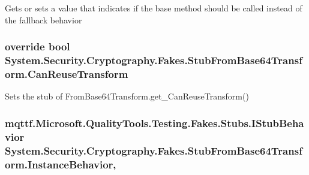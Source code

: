 Gets or sets a value that indicates if the base method should be called instead of the fallback behavior

\hypertarget{class_system_1_1_security_1_1_cryptography_1_1_fakes_1_1_stub_from_base64_transform_ac52c0e17d1e3cd6a7dc624df274207b6}{
\subsubsection[{Can\-Reuse\-Transform}]{\setlength{\rightskip}{0pt plus 5cm}override bool System.\-Security.\-Cryptography.\-Fakes.\-Stub\-From\-Base64\-Transform.\-Can\-Reuse\-Transform\hspace{0.3cm}{\ttfamily [get]}}}\label{class_system_1_1_security_1_1_cryptography_1_1_fakes_1_1_stub_from_base64_transform_ac52c0e17d1e3cd6a7dc624df274207b6}


Sets the stub of From\-Base64\-Transform.\-get\-\_\-\-Can\-Reuse\-Transform()

\hypertarget{class_system_1_1_security_1_1_cryptography_1_1_fakes_1_1_stub_from_base64_transform_a09e913c10074d1053920675e170866a8}{
\subsubsection[{Instance\-Behavior}]{\setlength{\rightskip}{0pt plus 5cm}mqttf.\-Microsoft.\-Quality\-Tools.\-Testing.\-Fakes.\-Stubs.\-I\-Stub\-Behavior System.\-Security.\-Cryptography.\-Fakes.\-Stub\-From\-Base64\-Transform.\-Instance\-Behavior\hspace{0.3cm}{\ttfamily [get]}, {\ttfamily [set]}}}\label{class_system_1_1_security_1_1_cryptography_1_1_fakes_1_1_stub_from_base64_transform_a09e913c10074d1053920675e170866a8}


